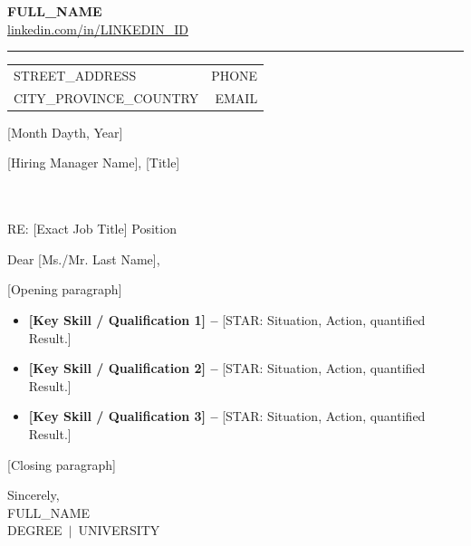 \documentclass[11pt, letterpaper]{article}
\begin{document}
\pagestyle{empty}

\begin{center}
  {\Large\bfseries {{FULL_NAME}}}\\[2pt]
  {\small\href{https://linkedin.com/in/{{LINKEDIN_ID}}}{linkedin.com/in/{{LINKEDIN_ID}}}}
\end{center}

\noindent\rule{\textwidth}{0.4pt}

\vspace{2pt}
\begin{tabularx}{\textwidth}{@{}X r@{}}
  {{STREET_ADDRESS}}     & {{PHONE}} \\
  {{CITY_PROVINCE_COUNTRY}}   & {{EMAIL}} \\
\end{tabularx}

\vspace{10pt}

[Month Dayth, Year]

\vspace{6pt}

[Hiring Manager Name], [Title]\\
[Company Name]\\
[Street Address]\\
[City, Province, Postal Code]

\vspace{6pt}

RE: [Exact Job Title] Position

\vspace{6pt}

Dear [Ms./Mr. Last Name],

[Opening paragraph]

\begin{itemize}

  \item \textbf{[Key Skill / Qualification 1] --} [STAR: Situation, Action, quantified Result.]

  \item \textbf{[Key Skill / Qualification 2] --} [STAR: Situation, Action, quantified Result.]

  \item \textbf{[Key Skill / Qualification 3] --} [STAR: Situation, Action, quantified Result.]

\end{itemize}

[Closing paragraph]

\vspace{10pt}

Sincerely,\\
{{FULL_NAME}}\\
{{DEGREE}}~$|$~{{UNIVERSITY}}
\end{document}

